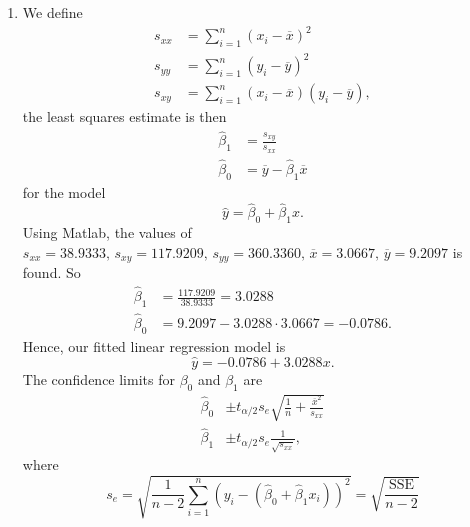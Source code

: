     \begin{derivation}
      \begin{enumerate}[label=\alph*)]
        \item We define
          \begin{align*}
            s_{x x} &= \sum_{i = 1}^{n} \left( x_i - \overline{x} \right)^2 \\
            s_{yy} &= \sum_{i = 1}^{n} \left( y_i  - \overline{y} \right)^2 \\
            s_{xy} &= \sum_{i = 1}^{n} \left( x_i - \overline{x} \right) \left( y_i - \overline{y} \right)
          ,\end{align*}
          the least squares estimate is then
          \begin{align*}
            \hat{\beta}_1 &= \frac{s_{xy}}{s_{x x}} \\
            \hat{\beta}_0 &= \overline{y} - \hat{\beta}_1 \overline{x}
          \end{align*}
          for the model 
          \begin{equation*}
            \hat{y} = \hat{\beta}_0 + \hat{\beta}_1 x
          .\end{equation*}
          Using Matlab, the values of $s_{x x} = \num{38,9333} , \, s_{xy} = \num{117,9209} ,\,  s_{yy} = \num{360,3360},\,  \overline{x} = \num{3,0667}, \,  \overline{y} = \num{9,2097}  $ is found.
          So
          \begin{align*}
            \hat{\beta}_1 &= \frac{\num{117,9209}}{\num{38,9333} } = \num{3,0288}  \\
            \hat{\beta}_0 &= \num{9,2097} - \num{3,0288} \cdot \num{3,0667}  = -\num{0,0786} 
          .\end{align*}
          Hence, our fitted linear regression model is
          \begin{equation*}
            \hat{y} = - \num{0,0786}  + \num{3,0288} x
          .\end{equation*}
          The confidence limits for $\beta_0$ and $\beta_1$ are
          \begin{align*}
            \hat{\beta}_0 &\pm t_{\alpha / 2} s_e \sqrt{\frac{1}{n} + \frac{\overline{x}^2}{s_{x x}}} \\
            \hat{\beta}_1 &\pm t_{\alpha / 2}s_e \frac{1}{\sqrt{s_{x x}}}
          ,\end{align*}
          where
          \begin{equation*}
            s_e = \sqrt{\frac{1}{n-2} \sum_{i = 1}^{n} \left( y_i - \left( \hat{\beta}_0 + \hat{\beta}_1 x_i \right) \right)^2} = \sqrt{\frac{\text{SSE}}{n-2}}

\end{equation*}
\end{enumerate}
\end{derivation}
